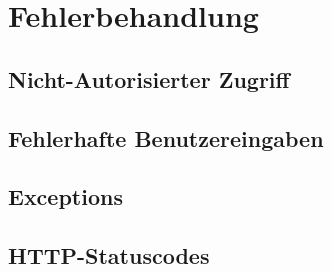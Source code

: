 \section{Fehlerbehandlung}
	\subsection{Nicht-Autorisierter Zugriff}
	\subsection{Fehlerhafte Benutzereingaben}
	\subsection{Exceptions}
	\subsection{HTTP-Statuscodes}		     


